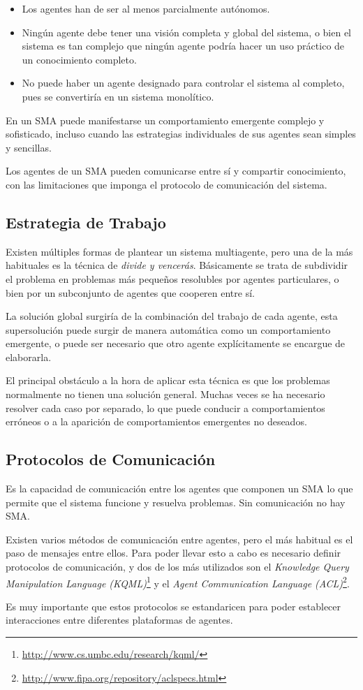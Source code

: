 \begin{itemize}
 \item Los agentes han de ser al menos parcialmente autónomos.
 \item Ningún agente debe tener una visión completa y global del sistema, o
 bien el sistema es tan complejo que ningún agente podría hacer un uso práctico
 de un conocimiento completo.
 \item No puede haber un agente designado para controlar el sistema al
 completo, pues se convertiría en un sistema monolítico.
\end{itemize}

En un SMA puede manifestarse un comportamiento emergente complejo y sofisticado,
incluso cuando las estrategias individuales de sus agentes sean simples y
sencillas.

Los agentes de un SMA pueden comunicarse entre sí y compartir conocimiento, con
las limitaciones que imponga el protocolo de comunicación del sistema.

\subsection*{Estrategia de Trabajo}

Existen múltiples formas de plantear un sistema multiagente, pero una de la más
habituales es la técnica de {\em divide y vencerás}. Básicamente se trata de
subdividir el problema en problemas más pequeños resolubles por agentes
particulares, o bien por un subconjunto de agentes que cooperen entre sí.

La solución global surgiría de la combinación del trabajo de cada agente, esta
supersolución puede surgir de manera automática como un comportamiento
emergente, o puede ser necesario que otro agente explícitamente se encargue de
elaborarla.

El principal obstáculo a la hora de aplicar esta técnica es que los problemas
normalmente no tienen una solución general. Muchas veces se ha necesario
resolver cada caso por separado, lo que puede conducir a comportamientos
erróneos o a la aparición de comportamientos emergentes no deseados.

\subsection*{Protocolos de Comunicación}

Es la capacidad de comunicación entre los agentes que componen un SMA lo que
permite que el sistema funcione y resuelva problemas. Sin comunicación no hay
SMA.

Existen varios métodos de comunicación entre agentes, pero el más habitual es
el paso de mensajes entre ellos. Para poder llevar esto a cabo es necesario
definir protocolos de comunicación, y dos de los más utilizados son el {\em
Knowledge Query Manipulation Language
(KQML)}\footnote{\url{http://www.cs.umbc.edu/research/kqml/}} y el {\em Agent
Communication Language
(ACL)}\footnote{\url{http://www.fipa.org/repository/aclspecs.html}}.

Es muy importante que estos protocolos se estandaricen para poder establecer
interacciones entre diferentes plataformas de agentes.